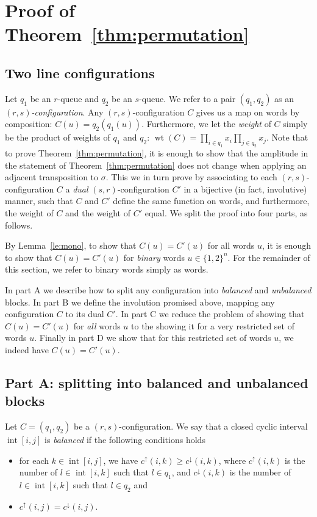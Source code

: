 \documentclass[reqno]{amsart}
\newcommand{\0}{\phantom{c}}
\DeclareMathOperator{\inter}{int} %
\DeclareMathOperator{\wt}{wt} %
\let\prodnonlimits\prod
\renewcommand{\prod}{\prodnonlimits\limits}
\newcommand{\defn}[1]{{\color{darkred}\emph{#1}}} %
\theoremstyle{plain}
\theoremstyle{definition}
\numberwithin{equation}{section}
\begin{document}
\section{Proof of Theorem~\ref{thm:permutation}}

\subsection{Two line configurations}

Let $q_1$ be an $r$-queue and $q_2$ be an $s$-queue.
We refer to a pair $(q_1, q_2)$ as an \defn{$(r,s)$-configuration}.
Any $(r,s)$-configuration $C$ gives us a map on words by composition: $C(u) = q_2(q_1(u))$.
Furthermore, we let the \defn{weight} of $C$ simply be the product of weights of $q_1$ and $q_2$: $\wt(C)=\prod_{i\in q_1}x_i\prod_{j\in q_2}x_j$.
Note that to prove Theorem~\ref{thm:permutation}, it is enough to show that the amplitude in the statement of Theorem~\ref{thm:permutation} does not change when applying an adjacent transposition to $\sigma$.
This we in turn prove by associating to each $(r,s)$-configuration $C$ a \defn{dual} $(s,r)$-configuration $C'$ in a bijective (in fact, involutive) manner, such that $C$ and $C'$ define the same function on words, and furthermore, the weight of $C$ and the weight of $C'$ equal. We split the proof into four parts, as follows.

By Lemma~\ref{le:mono}, to show that $C(u) = C'(u)$ for all words $u$, it is enough to show that $C(u) = C'(u)$ for \emph{binary} words $u \in \{1,2\}^n$. For the remainder of this section, we refer to binary words simply as words. 

In part A we describe how to split any configuration into \defn{balanced} and \defn{unbalanced} blocks. In part B we define the involution promised above, mapping any configuration $C$ to its dual $C'$. In part C we reduce the problem of showing that $C(u) = C'(u)$ for \emph{all} words $u$ to the showing it for a very restricted set of words $u$. Finally in part D we show that for this restricted set of words $u$, we indeed have $C(u) = C'(u)$.

\subsection{Part A: splitting into balanced and unbalanced blocks}

Let $C=(q_1,q_2)$ be a $(r,s)$-configuration. We say that a closed cyclic interval $\inter[i,j]$ is \defn{balanced} if the following conditions holds
\begin{itemize}
  \item for each $k \in \inter[i,j]$, we have $c^\uparrow(i,k) \geq c^\downarrow(i,k)$, where $c^{\uparrow}(i,k)$ is the number of $l \in \inter[i,k]$ such that $l \in q_1$, and $c^\downarrow(i,k)$ is the number of $l\in\inter[i,k]$ such that $l\in q_2$ and
  \item $c^{\uparrow}(i,j) = c^{\downarrow}(i,j)$.
\end{itemize}
\end{document}
